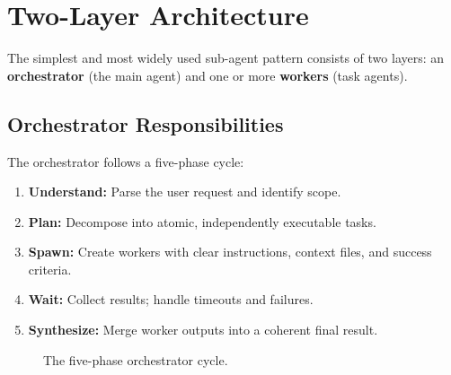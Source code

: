 \documentclass[11pt,letterpaper,twocolumn]{article}
\begin{document}
\section{Two-Layer Architecture}
\label{sec:twolayer}

The simplest and most widely used sub-agent pattern consists of two layers:
an \textbf{orchestrator} (the main agent) and one or more \textbf{workers}
(task agents).

\subsection{Orchestrator Responsibilities}

The orchestrator follows a five-phase cycle:

\begin{enumerate}[leftmargin=*,itemsep=1pt]
  \item \textbf{Understand:} Parse the user request and identify scope.
  \item \textbf{Plan:} Decompose into atomic, independently executable
    tasks.
  \item \textbf{Spawn:} Create workers with clear instructions, context
    files, and success criteria.
  \item \textbf{Wait:} Collect results; handle timeouts and failures.
  \item \textbf{Synthesize:} Merge worker outputs into a coherent final
    result.
\end{enumerate}

\begin{figure}[t]
\centering
{}
\caption{The five-phase orchestrator cycle.}
\label{fig:orchestrator-cycle}
\end{figure}
\end{document}

